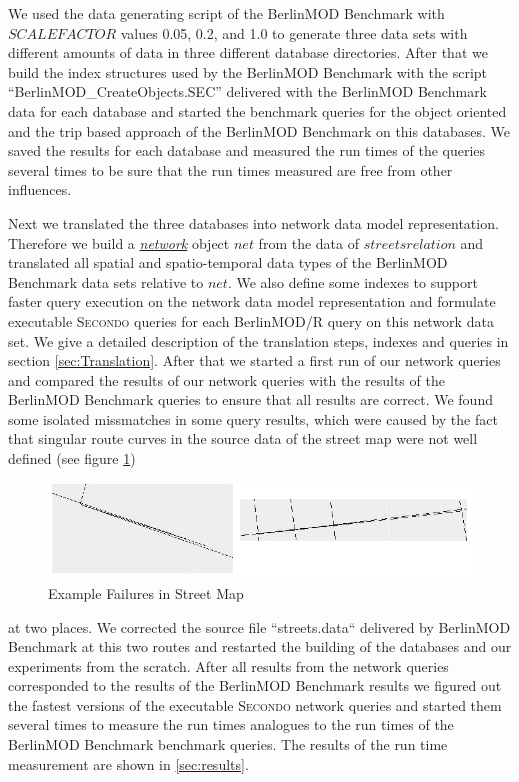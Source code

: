 \documentclass[a4paper]{article}
\newcommand{\secondo}{\textsc{Secondo}}
\newcommand{\bmodb} {BerlinMOD Benchmark}
\newcommand{\dt}[1]{\textsl{\underline{#1}}}
\begin{document}
{We used the data generating script of the \bmodb{} with $SCALEFACTOR$ values
0.05, 0.2, and 1.0 to generate three data sets with different amounts of data in
three different database directories. After that we build the index structures
used by the \bmodb{} with the script ``BerlinMOD\_CreateObjects.SEC'' delivered
with the \bmodb{} data for each database and started the benchmark queries for
the object oriented and the trip based approach of the \bmodb{} on this databases.
We saved the results for each database and measured the run times of the queries
several times to be sure that the run times measured are free from other influences.

Next we translated the three databases into network data model representation.
Therefore we build a \dt{network} object $net$ from the data of $streets relation$
and translated all spatial and spatio-temporal data types of the \bmodb{} data
sets relative to $net$. We also define some indexes to support faster query
execution on the network data model representation and formulate executable
\secondo{} queries for each BerlinMOD/R query on this network data set.
We give a detailed description of the translation steps, indexes and queries in
section \ref{sec:Translation}. After that we started a first run of our network
queries and compared the results of our network queries with the results of the
\bmodb{} queries to ensure that all results are correct. We found some isolated
missmatches in some query results, which were caused by the fact that singular
route curves in the source data of the street map were not well defined
(see figure \ref{fig:routefailure})
\begin{figure}
\begin{center}
   \includegraphics[scale=1.0]{routefailure.eps}
   \caption{Example Failures in Street Map}
   \label{fig:routefailure}
   \end{center}
\end{figure}
at two places. We corrected the source file ``streets.data`` delivered by \bmodb{}
at this two routes and restarted the building of the databases and our experiments
from the scratch. After all results from the network queries corresponded to the
results of the \bmodb{} results we figured out the fastest versions of the
executable \secondo{} network queries and started them several times to measure
the run times analogues to the run times of the \bmodb{} benchmark queries. The
results of the run time measurement are shown in \ref{sec:results}.
}
\end{document}
